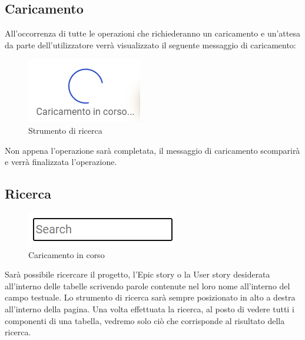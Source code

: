 \documentclass{article}
\begin{document}
\subsection{Caricamento}
All'occorrenza di tutte le operazioni che richiederanno un caricamento e un'attesa da parte dell'utilizzatore verrà visualizzato il seguente messaggio di caricamento:
 \begin{figure}[H]
      \centering
      \includegraphics{documenti/Screenshot manuale utente/caricamento in corso.png}
      \caption{Strumento di ricerca}
      \label{search}
    \end{figure} 
Non appena l'operazione sarà completata, il messaggio di caricamento scomparirà e verrà finalizzata l'operazione.

\subsection{Ricerca}
 \begin{figure}[H]
      \centering
      \includegraphics{documenti/Screenshot manuale utente/search.png}
      \caption{Caricamento in corso}
      \label{loading}
    \end{figure} 
Sarà possibile ricercare il progetto, l'Epic story o la User story desiderata all'interno delle tabelle scrivendo parole contenute nel loro nome all'interno del campo testuale. Lo strumento di ricerca sarà sempre posizionato in alto a destra all'interno della pagina. Una volta effettuata la ricerca, al posto di vedere tutti i componenti di una tabella, vedremo solo ciò che corrisponde al risultato della ricerca.
\end{document}
